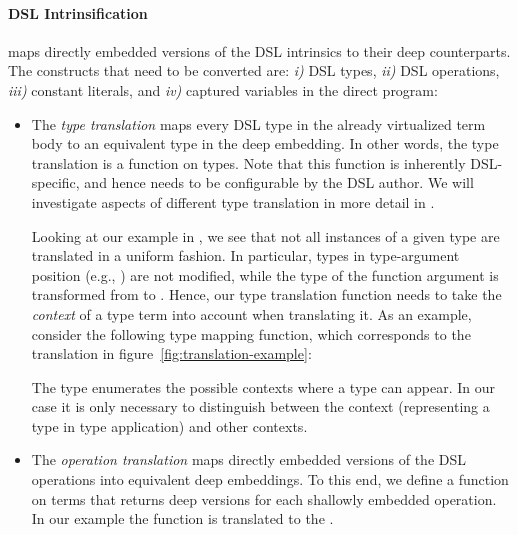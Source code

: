 \documentclass[paper.tex]{subfiles}
\begin{document}
\paragraph{DSL Intrinsification} maps directly embedded versions
of the DSL intrinsics to their deep counterparts.  The constructs that
need to be converted are: \emph{i)} DSL types, \emph{ii)} DSL
operations, \emph{iii)} constant literals, and \emph{iv)} captured
variables in the direct program:
\begin{itemize}
\item The \emph{type translation} maps every DSL type in the already
  virtualized term body to an equivalent type in the deep embedding.
  In other words, the type translation is a function  on
  types.  Note that this function is inherently DSL-specific, and
  hence needs to be configurable by the DSL author.  We will
  investigate aspects of different type translation in more detail in
  .

Looking at our example in , we see that not all instances of a given type are translated in a uniform fashion.  In particular, types in type-argument position (e.g., ) are not modified, while the type of the function argument is transformed from  to . Hence, our type translation function  needs to take the \emph{context} of a type term into account when translating it.  As an example, consider the following type mapping function, which corresponds to the translation in figure~\ref{fig:translation-example}:
\lstset{mathescape=false}
\lstset{mathescape=true}
The  type enumerates the possible contexts where a type can appear.  In our case it is only necessary to distinguish between the  context (representing a type in  type application) and other contexts.

\item The \emph{operation translation} maps directly embedded versions of the DSL operations into equivalent deep embeddings.  To this end, we define a function  on terms that returns deep versions for each shallowly embedded operation.  In our example the function  is translated to the .


\end{itemize}
\end{document}
